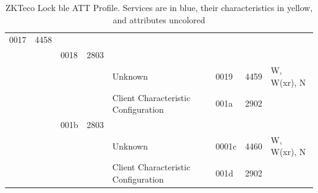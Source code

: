 \documentclass[conference]{IEEEtran}
\begin{document}
\begin{landscape}
\begin{table}[ht]
\begin{tabular}{@{}llllllll@{}}
{\color[HTML]{000000} 0017} & {\color[HTML]{000000} 4458} & {\color[HTML]{000000} }      & {\color[HTML]{000000} }      & {\color[HTML]{000000} }                                                                & {\color[HTML]{000000} }  & {\color[HTML]{000000} }          & {\color[HTML]{000000} }                                                                                            \\
                            &                             & \cellcolor[HTML]{FFFE65}0018 & \cellcolor[HTML]{FFFE65}2803 & \cellcolor[HTML]{FFFE65}                                                               & \cellcolor[HTML]{FFFE65} & \cellcolor[HTML]{FFFE65}         & \cellcolor[HTML]{FFFE65}                                                                                           \\
                            &                             &                              &                              & Unknown                                                                                & 0019                     & 4459                             & W, W(xr), N                                                                                                        \\
                            &                             &                              &                              & Client Characteristic Configuration                                                    & 001a                     & 2902                             &                                                                                                                    \\
                            &                             & \cellcolor[HTML]{FFFE65}001b & \cellcolor[HTML]{FFFE65}2803 & \cellcolor[HTML]{FFFE65}                                                               & \cellcolor[HTML]{FFFE65} & \cellcolor[HTML]{FFFE65}         & \cellcolor[HTML]{FFFE65}                                                                                           \\
                            &                             &                              &                              & Unknown                                                                                & 0001c                    & 4460                             & W, W(xr), N                                                                                                        \\
                            &                             &                              &                              & Client Characteristic Configuration                                                    & 001d                     & 2902                             &                                                                                                                    \\ \bottomrule
\end{tabular}
\caption{ZKTeco Lock \gls{ble} ATT Profile.  Services are in blue, their characteristics in yellow, and attributes uncolored}
\label{tab:att}
\end{table}
\end{landscape}
\end{document}
